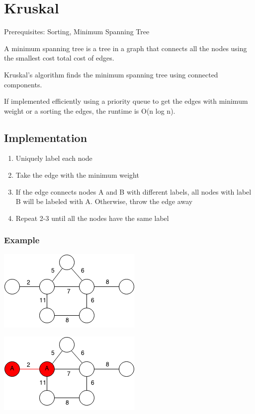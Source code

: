 \documentclass[11pt,oneside]{book}
\makeatletter
\def\maxwidth#1{\ifdim\Gin@nat@width>#1 #1\else\Gin@nat@width\fi}
\makeatother
\begin{document}
        \section{ Kruskal }
        

Prerequisites:  Sorting, Minimum Spanning Tree

A minimum spanning tree is a tree in a graph that connects all the nodes using the smallest cost total cost of edges.

Kruskal's algorithm finds the minimum spanning tree using connected components.

If implemented efficiently using a priority queue to get the edges with minimum weight or a sorting the edges, the runtime is O(n log n).

\subsection{Implementation}

\begin{enumerate}
\item Uniquely label each node
\item Take the edge with the minimum weight
\item If the edge connects nodes A and B with different labels, all nodes with label B will be labeled with A. Otherwise, throw the edge away
\item Repeat 2-3 until all the nodes have the same label
\end{enumerate}

\subsubsection{Example}

\vspace{5px}\includegraphics[width=\maxwidth{\textwidth}]{kruskal.png}

\vspace{5px}\includegraphics[width=\maxwidth{\textwidth}]{kruskal2.png}
\end{document}
